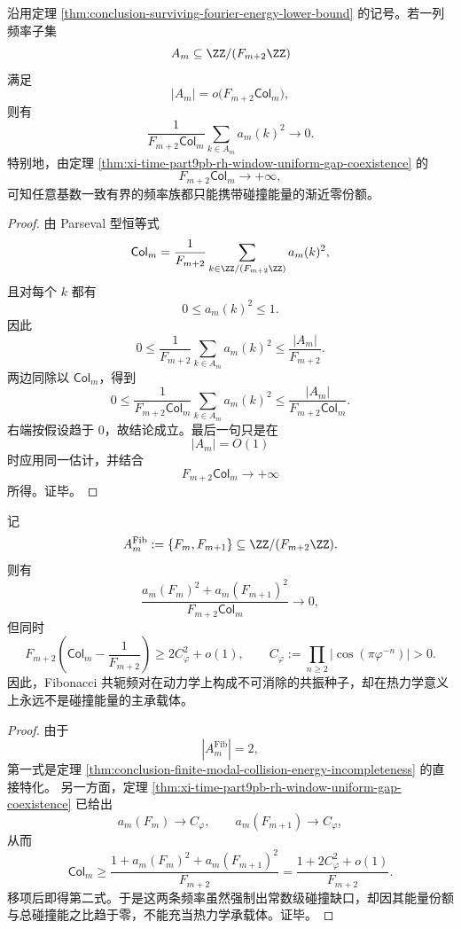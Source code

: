 \begin{theorem}[有限模态碰撞能量的不完备性]\label{thm:conclusion-finite-modal-collision-energy-incompleteness}
沿用定理 \ref{thm:conclusion-surviving-fourier-energy-lower-bound} 的记号。若一列频率子集
\[
A_m\subseteq \ZZ/(F_{m+2}\ZZ)
\]
满足
\[
|A_m|=o\!\bigl(F_{m+2}\mathsf{Col}_m\bigr),
\]
则有
\[
\frac{1}{F_{m+2}\mathsf{Col}_m}\sum_{k\in A_m}a_m(k)^2\longrightarrow 0.
\]
特别地，由定理 \ref{thm:xi-time-part9pb-rh-window-uniform-gap-coexistence} 的
\[
F_{m+2}\mathsf{Col}_m\to+\infty,
\]
可知任意基数一致有界的频率族都只能携带碰撞能量的渐近零份额。
\end{theorem}
\begin{proof}
由 Parseval 型恒等式
\[
\mathsf{Col}_m=\frac1{F_{m+2}}\sum_{k\in \ZZ/(F_{m+2}\ZZ)}a_m(k)^2,
\]
且对每个 \(k\) 都有
\[
0\le a_m(k)^2\le 1.
\]
因此
\[
0\le
\frac1{F_{m+2}}\sum_{k\in A_m}a_m(k)^2
\le
\frac{|A_m|}{F_{m+2}}.
\]
两边同除以 \(\mathsf{Col}_m\)，得到
\[
0\le
\frac{1}{F_{m+2}\mathsf{Col}_m}\sum_{k\in A_m}a_m(k)^2
\le
\frac{|A_m|}{F_{m+2}\mathsf{Col}_m}.
\]
右端按假设趋于 \(0\)，故结论成立。最后一句只是在
\[
|A_m|=O(1)
\]
时应用同一估计，并结合
\[
F_{m+2}\mathsf{Col}_m\to+\infty
\]
所得。证毕。
\end{proof}

\begin{corollary}\label{cor:conclusion-fibonacci-resonance-seed-not-thermal-carrier}
记
\[
A_m^{\mathrm{Fib}}:=\{F_m,F_{m+1}\}\subseteq \ZZ/(F_{m+2}\ZZ).
\]
则有
\[
\frac{a_m(F_m)^2+a_m(F_{m+1})^2}{F_{m+2}\mathsf{Col}_m}\longrightarrow 0,
\]
但同时
\[
F_{m+2}\left(\mathsf{Col}_m-\frac1{F_{m+2}}\right)\ge 2C_\varphi^2+o(1),
\qquad
C_\varphi:=\prod_{n\ge 2}\left|\cos(\pi\varphi^{-n})\right|>0.
\]
因此，Fibonacci 共轭频对在动力学上构成不可消除的共振种子，却在热力学意义上永远不是碰撞能量的主承载体。
\end{corollary}
\begin{proof}
由于
\[
|A_m^{\mathrm{Fib}}|=2,
\]
第一式是定理 \ref{thm:conclusion-finite-modal-collision-energy-incompleteness} 的直接特化。
另一方面，定理 \ref{thm:xi-time-part9pb-rh-window-uniform-gap-coexistence} 已给出
\[
a_m(F_m)\to C_\varphi,
\qquad
a_m(F_{m+1})\to C_\varphi,
\]
从而
\[
\mathsf{Col}_m
\ge
\frac{1+a_m(F_m)^2+a_m(F_{m+1})^2}{F_{m+2}}
=
\frac{1+2C_\varphi^2+o(1)}{F_{m+2}}.
\]
移项后即得第二式。于是这两条频率虽然强制出常数级碰撞缺口，却因其能量份额与总碰撞能之比趋于零，不能充当热力学承载体。证毕。
\end{proof}

